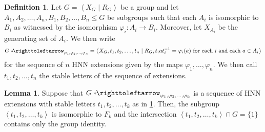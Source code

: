 \documentclass[11pt,a4paper,reqno]{amsart}
\theoremstyle{plain}
\theoremstyle{definition}
\newtheorem{lemma}[theorem]{Lemma}
\newtheorem{definition}[theorem]{Definition}
\theoremstyle{definition}
\renewcommand\leq\leqslant
\newcommand\hnn{*\!\!\righttoleftarrow}
\begin{document}
\begin{definition}\label{def:hnn-sequence}
	Let $G = \left\langle X_G\mid R_G\right\rangle$ be a group and let $A_1,A_2,\ldots,A_n,B_1,B_2,\ldots,B_n\leq G$ be subgroups such that each $A_i$ is isomorphic to $B_i$ as witnessed by the isomorphism $\varphi_i\colon A_i \to B_i$.
	Moreover, let $X_{A_i}$ be the generating set of $A_i$.
	We then write
	\[
		G\hnn_{\varphi_1, \varphi_2,\ldots,\varphi_n}
		=
		\left\langle
		X_G,t_1,t_2,\ldots,t_n
		\mid
		R_G,
		t_i a t_i^{-1} = \varphi_i(a)
		\text{ for each }i\text{ and each }a\in A_i
		\right\rangle
	\]
	for the sequence of $n$ HNN extensions given by the maps $\varphi_1,\ldots,\varphi_n$.
	We then call $t_1,t_2,\ldots,t_n$ the stable letters of the sequence of extensions.
\end{definition}

\begin{lemma}\label{lem:hnn-sequence}
	Suppose that
	$G\hnn_{\varphi_1, \varphi_2,\ldots,\varphi_k}$
	is a sequence of HNN extensions with stable letters $t_1,t_2,\ldots,t_k$ as in \cref{def:hnn-sequence}.
	Then, the subgroup $\left\langle t_1,t_2,\ldots,t_k\right\rangle$ is isomorphic to $F_k$ and the intersection $\left\langle t_1,t_2,\ldots,t_k\right\rangle \cap G = \{1\}$ contains only the group identity.
\end{lemma}
\end{document}
